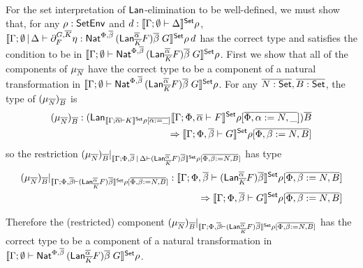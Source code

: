 \documentclass[acmsmall,review,anonymous]{acmart}
\theoremstyle{definition}
\newcommand{\set}{\mathsf{Set}}
\begin{document}
  For the set interpretation of $\mathsf{Lan}$-elimination to be well-defined, 
  we must show that, for any $\rho : \mathsf{SetEnv}$ and $d : \setsem{\Gamma; \emptyset \vdash \Delta} \rho$, 
  $\setsem{\Gamma; \emptyset \,|\, \Delta \vdash \partial^{G, \ol K}_F \eta :
    \Nat^{\Phi, \ol\beta}\, (\Lan^{\ol\alpha}_{\ol K} F)\ol \beta\; G} \rho \, d$
  has the correct type and satisfies the condition to be in 
  $\setsem{\Gamma; \emptyset \vdash 
    \Nat^{\Phi, \ol\beta}\, (\Lan^{\ol\alpha}_{\ol K} F)\ol \beta\; G} \rho$.
  First we show that all of the components of $\mu_{\overline{N}}$ have the 
  correct type to be a component of a natural transformation in 
  $\setsem{\Gamma; \emptyset \vdash 
    \Nat^{\Phi, \ol\beta}\, (\Lan^{\ol\alpha}_{\ol K} F)\ol \beta\; G} \rho$.
  For any $\ol{N : \set}, \ol{B : \set}$, the type of $(\mu_{\overline{N}})_{\overline{B}}$ is 
  \begin{align*}
    (\mu_{\ol{N}})_{\ol{B}} :  
    (\Lan_{\setsem{\Gamma; \ol\alpha \vdash K}\rho {[\ol{\alpha := \_} ]}}
        \setsem{\Gamma; \Phi, \ol\alpha \vdash F}\rho {[\ol{\Phi, \alpha := N, \_} ]}
        )\ol{B}
  \\
  \Rightarrow 
            \setsem{\Gamma; \Phi, \ol\beta \vdash G} 
              \rho[\ol{\Phi, \beta := N, B}]
  \end{align*}
  so the restriction  
  $(\mu_{\ol{N}})_{\ol{B}}  |_{\setsem{\Gamma; \Phi, \ol\beta \,|\, 
  \Delta \vdash (\Lan^{\ol\alpha}_{\ol K} F)\ol \beta } \rho[\ol{\Phi, \beta := N, B}]}$
  has type 
  \begin{align*}
    (\mu_{\ol{N}})_{\ol{B}} |_{\setsem{\Gamma; \Phi, \ol\beta 
              \vdash (\Lan^{\ol\alpha}_{\ol K} F)\ol \beta } \rho[\ol{\Phi, \beta := N, B}]}
    : 
{\setsem{\Gamma; \Phi, \ol\beta 
              \vdash (\Lan^{\ol\alpha}_{\ol K} F)\ol \beta } \rho[\ol{\Phi, \beta := N, B}]}
  \\
  \Rightarrow 
            \setsem{\Gamma; \Phi, \ol\beta \vdash G} 
              \rho[\ol{\Phi, \beta := N, B}]
  \end{align*}

    \noindent
    Therefore the (restricted) component
    $(\mu_{\ol{N}})_{\ol{B}} |_{\setsem{\Gamma; \Phi, \ol\beta 
    \vdash (\Lan^{\ol\alpha}_{\ol K} F)\ol \beta } \rho[\ol{\Phi, \beta := N, B}]}$
    has the correct type to be a component of a natural transformation in
    $\setsem{\Gamma; \emptyset \vdash 
      \Nat^{\Phi, \ol\beta}\, (\Lan^{\ol\alpha}_{\ol K} F)\ol \beta\; G} \rho$.
\end{document}

